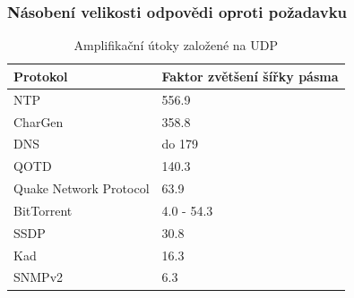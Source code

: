 \documentclass[%
12pt,       				%
t,                  %
aspectratio=1610,   %
unicode,						%
czech,              %
]{beamer}				    	%
\begin{document}
\begin{frame}
\frametitle{Násobení velikosti odpovědi oproti požadavku}
\vspace{0.1cm}
\begin{table}[ht]
\centering
\caption{Amplifikační útoky založené na UDP}
\label{tab:udp_ampl}
\begin{tabular}{|l|l|}
\hline
\textbf{Protokol}      & \textbf{Faktor zvětšení šířky pásma}    \\ \hline
NTP                    & 556.9                                   \\ \hline
CharGen                & 358.8                                   \\ \hline
DNS                    & do 179                                  \\ \hline
QOTD                   & 140.3                                   \\ \hline
Quake Network Protocol & 63.9                                    \\ \hline
BitTorrent             & 4.0 - 54.3                              \\ \hline
SSDP                   & 30.8                                    \\ \hline
Kad                    & 16.3                                    \\ \hline
SNMPv2                 & 6.3                                     \\ \hline
\end{tabular}
\end{table}
\end{frame}


%
\end{document}
